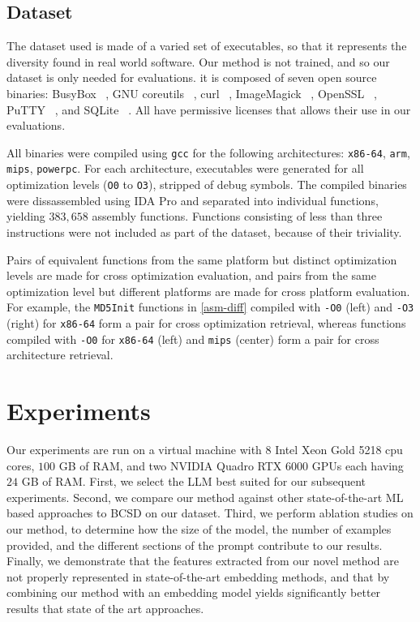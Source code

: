 \subsection{Dataset}

The dataset used is made of a varied set of executables, so that it represents the diversity found in real world software.
Our method is not trained, and so our dataset is only needed for evaluations. it is composed of seven open source binaries:
BusyBox ~\cite{busybox}, GNU coreutils ~\cite{coreutils}, curl ~\cite{curl}, ImageMagick ~\cite{image-magick}, OpenSSL ~\cite{openssl},
PuTTY ~\cite{putty}, and SQLite ~\cite{sqlite}. All have permissive licenses that allows their use in our evaluations. 

All binaries were compiled using \texttt{gcc} for the following architectures: \texttt{x86-64}, \texttt{arm}, \texttt{mips}, \texttt{powerpc}.
For each architecture, executables were generated for all optimization levels (\texttt{O0} to \texttt{O3}), stripped of debug symbols.
The compiled binaries were dissassembled using IDA Pro and separated into individual functions, yielding \(383,658\) assembly functions.
Functions consisting of less than three instructions were not included as part of the dataset, because of their triviality.

Pairs of equivalent functions from the same platform but distinct optimization levels are made for cross optimization
evaluation, and pairs from the same optimization level but different platforms are made for cross
platform evaluation. For example, the \texttt{MD5Init} functions in \autoref{asm-diff} compiled with \texttt{-O0} (left) and
\texttt{-O3} (right) for \texttt{x86-64} form a pair for cross optimization retrieval, whereas functions compiled with \texttt{-O0}
for \texttt{x86-64} (left) and \texttt{mips} (center) form a pair for cross architecture retrieval.

\section{Experiments}

Our experiments are run on a virtual machine with 8 Intel Xeon Gold 5218 cpu cores, \(100\) GB of RAM, and two NVIDIA Quadro RTX
6000 GPUs each having  \(24\) GB of RAM. First, we select the LLM best suited for our subsequent experiments. Second, we compare our
method against other state-of-the-art ML based approaches to BCSD on our dataset. Third, we perform ablation studies on our method,
to determine how the size of the model, the number of examples provided, and the different sections of the prompt contribute to our results.
Finally, we demonstrate that the features extracted from our novel method are not properly represented in state-of-the-art embedding methods,
and that by combining our method with an embedding model yields significantly better results that state of the art approaches.

